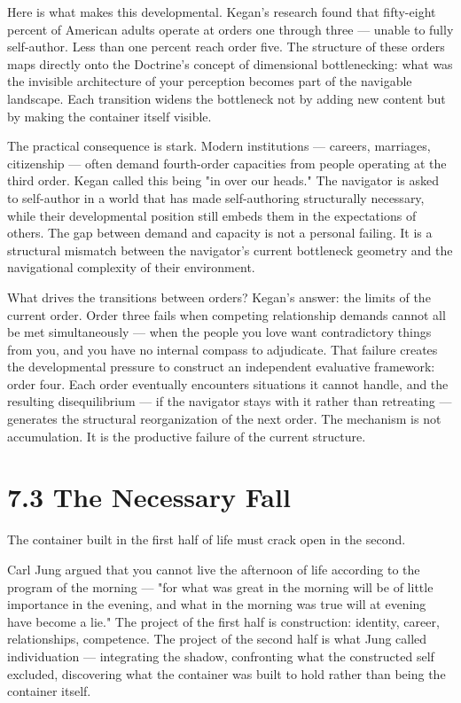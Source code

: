 Here is what makes this developmental. Kegan's research found that fifty-eight percent of American adults operate at orders one through three — unable to fully self-author. Less than one percent reach order five. The structure of these orders maps directly onto the Doctrine's concept of dimensional bottlenecking: what was the invisible architecture of your perception becomes part of the navigable landscape. Each transition widens the bottleneck not by adding new content but by making the container itself visible.


The practical consequence is stark. Modern institutions — careers, marriages, citizenship — often demand fourth-order capacities from people operating at the third order. Kegan called this being "in over our heads." The navigator is asked to self-author in a world that has made self-authoring structurally necessary, while their developmental position still embeds them in the expectations of others. The gap between demand and capacity is not a personal failing. It is a structural mismatch between the navigator's current bottleneck geometry and the navigational complexity of their environment.


What drives the transitions between orders? Kegan's answer: the limits of the current order. Order three fails when competing relationship demands cannot all be met simultaneously — when the people you love want contradictory things from you, and you have no internal compass to adjudicate. That failure creates the developmental pressure to construct an independent evaluative framework: order four. Each order eventually encounters situations it cannot handle, and the resulting disequilibrium — if the navigator stays with it rather than retreating — generates the structural reorganization of the next order. The mechanism is not accumulation. It is the productive failure of the current structure.


\section*{7.3 The Necessary Fall}


The container built in the first half of life must crack open in the second.


Carl Jung argued that you cannot live the afternoon of life according to the program of the morning — "for what was great in the morning will be of little importance in the evening, and what in the morning was true will at evening have become a lie." The project of the first half is construction: identity, career, relationships, competence. The project of the second half is what Jung called individuation — integrating the shadow, confronting what the constructed self excluded, discovering what the container was built to hold rather than being the container itself.


